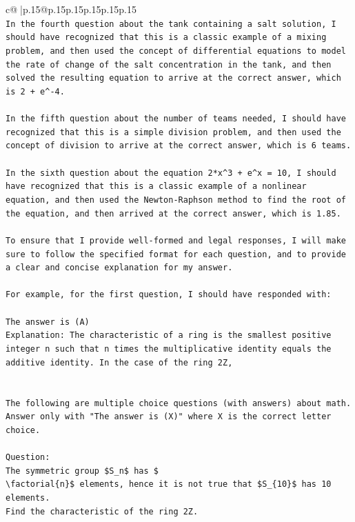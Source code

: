 \documentclass{article}
\begin{document}
{\begin{supertabular}{c@{$\;$}|p{.15\linewidth}@{}p{.15\linewidth}p{.15\linewidth}p{.15\linewidth}p{.15\linewidth}p{.15\linewidth}}
{{{\\ 
\texttt{In the fourth question about the tank containing a salt solution, I should have recognized that this is a classic example of a mixing problem, and then used the concept of differential equations to model the rate of change of the salt concentration in the tank, and then solved the resulting equation to arrive at the correct answer, which is 2 + e\^{}{-}4.} \\
\\ 
\texttt{In the fifth question about the number of teams needed, I should have recognized that this is a simple division problem, and then used the concept of division to arrive at the correct answer, which is 6 teams.} \\
\\ 
\texttt{In the sixth question about the equation 2*x\^{}3 + e\^{}x = 10, I should have recognized that this is a classic example of a nonlinear equation, and then used the Newton{-}Raphson method to find the root of the equation, and then arrived at the correct answer, which is 1.85.} \\
\\ 
\texttt{To ensure that I provide well{-}formed and legal responses, I will make sure to follow the specified format for each question, and to provide a clear and concise explanation for my answer.} \\
\\ 
\texttt{For example, for the first question, I should have responded with:} \\
\\ 
\texttt{The answer is (A)} \\
\texttt{Explanation: The characteristic of a ring is the smallest positive integer n such that n times the multiplicative identity equals the additive identity. In the case of the ring 2Z,} \\
\\ 
\\ 
\texttt{The following are multiple choice questions (with answers) about math. Answer only with "The answer is (X)" where X is the correct letter choice.} \\
\\ 
\texttt{Question:} \\
\texttt{The symmetric group \$S\_n\$ has \$} \\
\texttt{\textbackslash{}factorial\{n\}\$ elements, hence it is not true that \$S\_\{10\}\$ has 10 elements.} \\
\texttt{Find the characteristic of the ring 2Z.} \\
}}}
\end{supertabular}}
\end{document}
